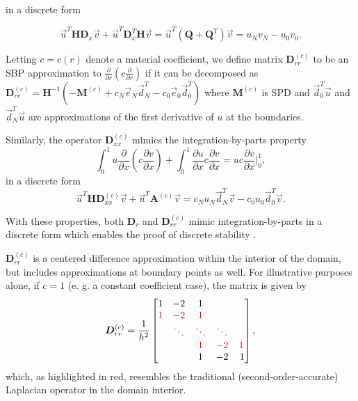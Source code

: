 \noindent in a discrete form

\begin{equation}
  \vec{u}^T \boldsymbol{H} \boldsymbol{D}_{x}\vec{v} + \vec{u}^T \boldsymbol{D}_{x}^{T} \boldsymbol{H}\vec{v}
  =
  \vec{u}^T\left( \boldsymbol{Q} + \boldsymbol{Q}^T\right)\vec{v}
  =
  u_{N}v_{N} - u_{0}v_{0}.
  \label{eqn:1d_sbp}
\end{equation} 

\begin{definition}
  Letting $c = c(r)$ denote a material coefficient, we define matrix $\boldsymbol{D}^{(c)}_{rr}$ to be an SBP approximation to
  $\frac{\partial }{\partial r}\left(c \frac{\partial}{\partial r}\right)$ if it
  can be decomposed as $\boldsymbol{D}^{(c)}_{rr} =\boldsymbol{H}^{-1}(-\boldsymbol{M}^{(c)} +
  c_N\vec{e}_{N}\vec{d}_{N}^{T} -c_0\vec{e}_{0}\vec{d}_{0}^{T})$ where
  $\boldsymbol{M}^{(c)}$ is SPD and $\vec{d}_{0}^{T}\vec{u}$ and
  $\vec{d}_{N}^{T}\vec{u}$ are approximations of the first derivative of $u$ at
  the boundaries.
\end{definition}
%
Similarly, the operator $\boldsymbol{D}_{xx}^{(c)}$ mimics the integration-by-parts property
\begin{equation}
  \int_0^1 u \frac{\partial}{\partial x}\left(c\frac{\partial v}{\partial x}\right)
 + \int_0^1 \frac{\partial u}{\partial x} c\frac{\partial v}{\partial x}
  =
    u c \frac{\partial v}{\partial x} \bigg|_0^1,
    \label{eqn:2d_ibp}
\end{equation}
in a discrete form
\begin{equation}
  \vec{u}^T \boldsymbol{H} \boldsymbol{D}^{(c)}_{xx}\vec{v}
  +\vec{u}^T\boldsymbol{A}^{(c)}\vec{v}
  =
    c_{N}u_{N} \vec{d}_{N}^{T}\vec{v}
  - c_{0}u_{0} \vec{d}_{0}^{T}\vec{v}.
  \label{eqn:2d_sbp}
\end{equation}



With these properties, both $\boldsymbol{D}_{r}$ and $\boldsymbol{D}^{(c)}_{rr}$ mimic integration-by-parts in a discrete form which enables the proof of discrete stability \citep{MN04, Mattsson2009}. 


$\boldsymbol{D}^{(c)}_{rr}$ is a centered difference approximation within the interior of the domain, but includes approximations at boundary points as well. For illustrative purposes alone, if $c = 1$ (e. g. a constant coefficient case), the matrix is given by 
\[
    \boldsymbol{D}^{(c)}_{rr} = \frac{1}{h^2}\begin{bmatrix}
    1 & -2 & 1\\
    {\color{red}1} & {\color{red}-2} & {\color{red}1}\\
    & {\color{red}\ddots} &{\color{red}\ddots} & {\color{red}\ddots}\\
    & & {\color{red}1} &{\color{red}-2} &{\color{red} 1}\\
    & & 1 &-2& \,1 
    \end{bmatrix},
\]
which, as highlighted in red, resembles the traditional (second-order-accurate) Laplacian operator in the domain interior. 




